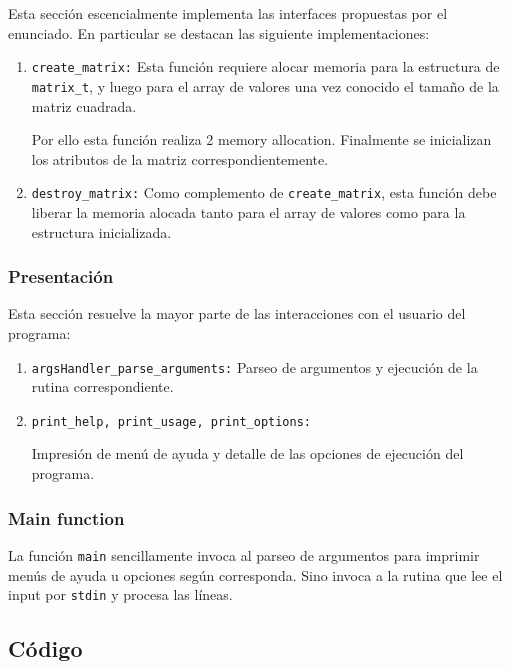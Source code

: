 \documentclass[a4paper,10pt, spanish]{article}
\begin{document}
Esta sección escencialmente implementa las interfaces propuestas por el enunciado. En particular se destacan las siguiente implementaciones:

\begin{enumerate}
	\item \lstinline{create_matrix:} Esta función requiere alocar memoria para la estructura de \lstinline{matrix_t}, y luego para el array de valores una vez conocido el tamaño de la matriz cuadrada.
  
  Por ello esta función realiza 2 memory allocation. Finalmente se inicializan los atributos de la matriz correspondientemente.
  
  \item \lstinline{destroy_matrix:} Como complemento de \lstinline{create_matrix}, esta función debe liberar la memoria alocada tanto para el array de valores como para la estructura inicializada.
\end{enumerate}

\subsubsection{Presentación}

Esta sección resuelve la mayor parte de las interacciones con el usuario del programa:

\begin{enumerate}
	\item \lstinline{argsHandler_parse_arguments:} Parseo de argumentos y ejecución de la rutina correspondiente.
  \item \lstinline{print_help, print_usage, print_options:} 
  
  Impresión de menú de ayuda y detalle de las opciones de ejecución del programa.
\end{enumerate}

\subsubsection{Main function}

La función \lstinline{main} sencillamente invoca al parseo de argumentos para imprimir menús de ayuda u opciones según corresponda. 
Sino invoca a la rutina que lee el input por \lstinline{stdin} y procesa las líneas.

\subsection{Código}
\end{document}
